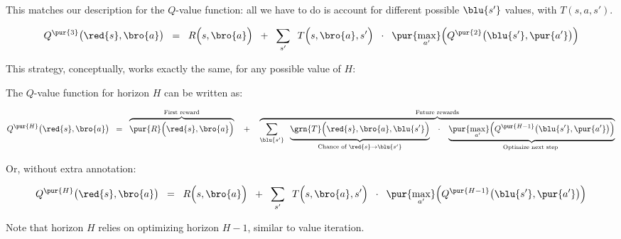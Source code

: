         This matches our description for the $Q$-value function: all we have to do is account for different possible $\blu{s'}$ values, with $ T(s,a,s')$.

        \begin{equation}
            Q^{\pur{3}}\big(\red{s}, \bro{a} \big) 
            \;\;=\;\;
            R \Big( s,\bro{a} \Big)
            \;\;+\;\;
            \sum_{s'}  
                \;\;
                T \Big( s,\bro{a},s' \Big)
                \;\;\cdot\;\;
                \pur{\max_{a'}} \Big( 
                Q^{\pur{2}}\big(\blu{s'}, \pur{a'} \big) 
            \Big)
        \end{equation}

        This strategy, conceptually, works exactly the same, for any possible value of $H$:\\

        \begin{kequation}
            The $Q$-value function for horizon $H$ can be written as:

            

            \begin{equation*}
                Q^{\pur{H}}\big(\red{s}, \bro{a} \big)
                \;\;=\;\; 
                \overbrace{
                    \pur{R} \Big( \red{s},\bro{a} \Big)
                }^{\text{First reward}} 
                \quad+\quad
                \overbrace{
                \sum_{\blu{s'}}  
                        \;\;
                        \underbrace{
                            \grn{T} \Big(   
                            \red{s},\bro{a},\blu{s'} \Big)
                        }_{\text{Chance of } \red{s} \to \blu{s'}}
                        \;\;\; \cdot \;\;\; 
                        \underbrace{
                            \pur{\max_{a'}} \Big( 
                            Q^{\pur{H-1}}\big(\blu{s'}, \pur{a'} \big) \Big)
                        }_{\text{Optimize next step } }
                }^{\text{Future rewards}}
            \end{equation*}

            Or, without extra annotation:

            \begin{equation*}
                Q^{\pur{H}}\big(\red{s}, \bro{a} \big) 
                \;\;=\;\;
                R \Big( s,\bro{a} \Big)
                \;\;+\;\;
                \sum_{s'}  
                    \;\;
                    T \Big( s,\bro{a},s' \Big)
                    \;\;\cdot\;\;
                    \pur{\max_{a'}} \Big( 
                    Q^{\pur{H-1}}\big(\blu{s'}, \pur{a'} \big) 
                \Big)
            \end{equation*}

            Note that horizon $H$ relies on optimizing horizon $H-1$, similar to value iteration.
        \end{kequation}

